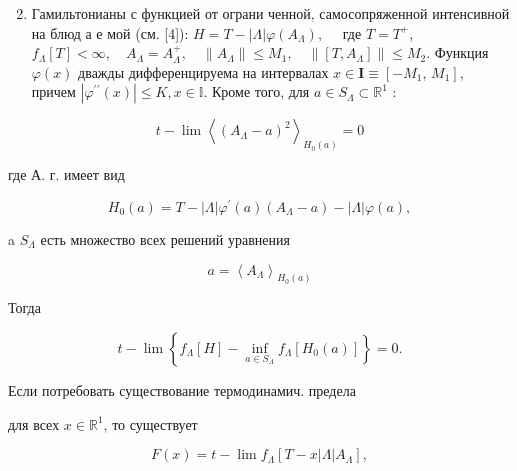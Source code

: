 \documentclass[10pt]{article}
\begin{document}
\begin{enumerate}

  \setcounter{enumi}{1}

  \item Гамильтонианы с функцией от ограни ченной, самосопряженной интенсивной на блюд а е мой (см. [4]): $H=T-|\Lambda| \varphi\left(A_{\Lambda}\right), \quad$ где $T=T^{+}$, $f_{\Lambda}[T]<\infty, \quad A_{\Lambda}=A_{\Lambda}^{+}, \quad\left\|A_{\Lambda}\right\| \leqslant M_{1}, \quad\left\|\left[T, A_{\Lambda}\right]\right\| \leqslant M_{2}$. Функция $\varphi(x)$ дважды дифференцируема на интервалах $x \in \mathbf{I} \equiv\left[-M_{1}\right.$, $\left.M_{1}\right]$, причем $\left|\varphi^{\prime \prime}(x)\right| \leqslant K, x \in \mathbb{I}$. Кроме того, для $a \in S_{\Lambda} \subset \mathbb{R}^{1}$ :

\end{enumerate}



\[

t-\lim \left\langle\left(A_{\Lambda}-a\right)^{2}\right\rangle_{H_{0}(a)}=0

\]



где А. г. имеет вид



\[

H_{0}(a)=T-|\Lambda| \varphi^{\prime}(a)\left(A_{\Lambda}-a\right)-|\Lambda| \varphi(a),

\]



a $S_{\Lambda}$ есть множество всех решений уравнения



\[

a=\left\langle A_{\Lambda}\right\rangle_{H_{0}(a)}

\]



Тогда



\[

t-\lim \left\{f_{\Lambda}[H]-\inf _{a \in S_{\Lambda}} f_{\Lambda}\left[H_{0}(a)\right]\right\}=0 .

\]



Если потребовать существование термодинамич. предела



для всех $x \in \mathbb{R}^{1}$, то существует



\[

F(x)=t-\lim f_{\Lambda}\left[T-x|\Lambda| A_{\Lambda}\right],

\]
\end{document}
